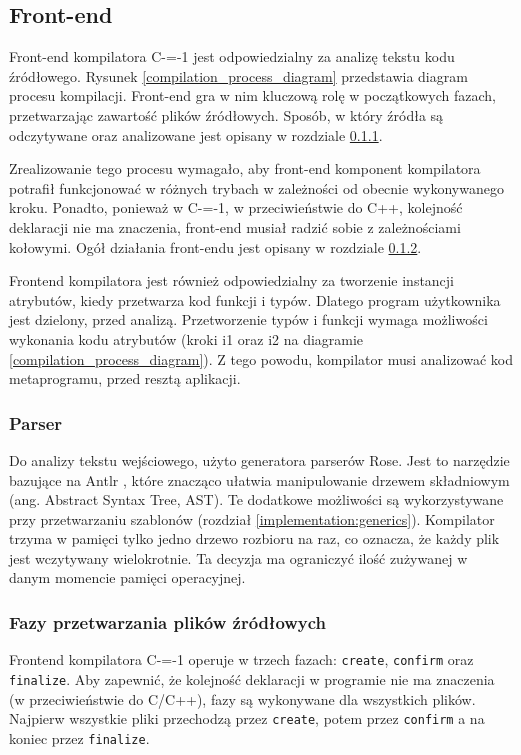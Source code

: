 \subsection{Front-end}
Front-end kompilatora C-=-1 jest odpowiedzialny za analizę tekstu kodu źródłowego. Rysunek \ref{compilation_process_diagram} przedstawia diagram procesu kompilacji.
Front-end gra w nim kluczową rolę w początkowych fazach, przetwarzając zawartość plików źródłowych.
Sposób, w który źródła są odczytywane oraz analizowane jest opisany w rozdziale \ref{implementation:parser}.

Zrealizowanie tego procesu wymagało, aby front-end komponent kompilatora potrafił funkcjonować w różnych trybach w zależności od obecnie wykonywanego kroku.
Ponadto, ponieważ w C-=-1, w przeciwieństwie do C++, kolejność deklaracji nie ma znaczenia, front-end musiał radzić sobie z zależnościami kołowymi.
Ogół działania front-endu jest opisany w rozdziale \ref{implementation:source_processing_phases}.

Frontend kompilatora jest również odpowiedzialny za tworzenie instancji atrybutów, kiedy przetwarza kod funkcji i typów.
Dlatego program użytkownika jest dzielony, przed analizą.
Przetworzenie typów i funkcji wymaga możliwości wykonania kodu atrybutów (kroki i1 oraz i2 na diagramie \ref{compilation_process_diagram}).
Z tego powodu, kompilator musi analizować kod metaprogramu, przed resztą aplikacji.

\subsubsection{Parser}
\label{implementation:parser}
Do analizy tekstu wejściowego, użyto generatora parserów Rose\cite{grabski2020}.
Jest to narzędzie bazujące na Antlr \cite{antlr}, które znacząco ułatwia manipulowanie drzewem składniowym (ang. Abstract Syntax Tree, AST).
Te dodatkowe możliwości są wykorzystywane przy przetwarzaniu szablonów (rozdział \ref{implementation:generics}).
Kompilator trzyma w pamięci tylko jedno drzewo rozbioru na raz, co oznacza, że każdy plik jest wczytywany wielokrotnie.
Ta decyzja ma ograniczyć ilość zużywanej w danym momencie pamięci operacyjnej.

\subsubsection{Fazy przetwarzania plików źródłowych}
\label{implementation:source_processing_phases}

Frontend kompilatora C-=-1 operuje w trzech fazach: \lstinline{create}, \lstinline{confirm} oraz \lstinline{finalize}.
Aby zapewnić, że kolejność deklaracji w programie nie ma znaczenia (w przeciwieństwie do C/C++), fazy są wykonywane dla wszystkich plików.
Najpierw wszystkie pliki przechodzą przez \lstinline{create}, potem przez \lstinline{confirm} a na koniec przez \lstinline{finalize}.

